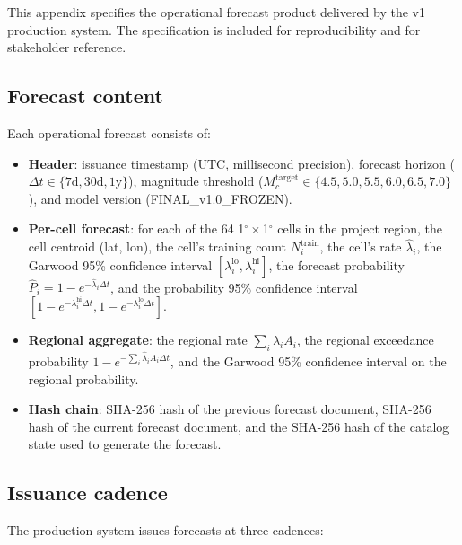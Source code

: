 \documentclass[10pt,a4paper,twocolumn]{article}
\begin{document}
This appendix specifies the operational forecast product delivered by the v1 production system. The specification is included for reproducibility and for stakeholder reference.

\subsection{Forecast content}

Each operational forecast consists of:

\begin{itemize}[leftmargin=1.2em,itemsep=2pt,topsep=2pt]
\item \textbf{Header}: issuance timestamp (UTC, millisecond precision), forecast horizon ($\Delta t \in \{7\text{d}, 30\text{d}, 1\text{y}\}$), magnitude threshold ($M_c^{\text{target}}\in\{4.5, 5.0, 5.5, 6.0, 6.5, 7.0\}$), and model version (FINAL\_v1.0\_FROZEN).
\item \textbf{Per-cell forecast}: for each of the 64 1$^\circ\times$1$^\circ$ cells in the project region, the cell centroid (lat, lon), the cell's training count $N_i^{\text{train}}$, the cell's rate $\hat\lambda_i$, the Garwood 95\% confidence interval $[\lambda_i^{\text{lo}}, \lambda_i^{\text{hi}}]$, the forecast probability $\hat P_i = 1 - e^{-\hat\lambda_i \Delta t}$, and the probability 95\% confidence interval $[1 - e^{-\lambda_i^{\text{hi}} \Delta t}, 1 - e^{-\lambda_i^{\text{lo}} \Delta t}]$.
\item \textbf{Regional aggregate}: the regional rate $\sum_i \hat\lambda_i A_i$, the regional exceedance probability $1 - e^{-\sum_i \hat\lambda_i A_i \Delta t}$, and the Garwood 95\% confidence interval on the regional probability.
\item \textbf{Hash chain}: SHA-256 hash of the previous forecast document, SHA-256 hash of the current forecast document, and the SHA-256 hash of the catalog state used to generate the forecast.
\end{itemize}

\subsection{Issuance cadence}

The production system issues forecasts at three cadences:
\end{document}
